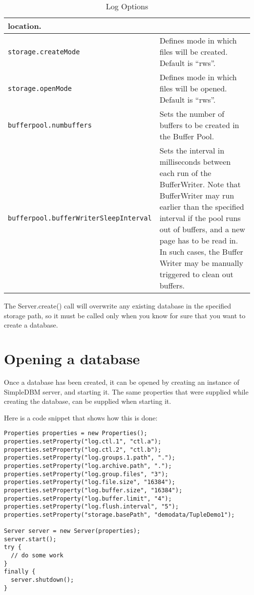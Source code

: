 \documentclass[a4paper,draft,oneside]{book}
\begin{document}
\begin{table}[h]
\begin{tabular}{|l|p{6cm}|}
  location.  \\
  \hline 
  \verb|storage.createMode|&Defines mode in which files will be
  created. Default is ``rws''.  \\
  \hline 
  \verb|storage.openMode|&Defines mode in which files will be
  opened. Default is ``rws''.  \\
  \hline 
  \verb|bufferpool.numbuffers|&Sets the number of buffers to be created in 
  the Buffer Pool.  \\
  \hline 
  \verb|bufferpool.bufferWriterSleepInterval|&Sets the interval in 
  milliseconds between each run of the BufferWriter. Note that BufferWriter 
  may run earlier than the specified interval if the pool runs out of 
  buffers, and a new page has to be read in. In such cases, the Buffer Writer
  may be manually triggered to clean out buffers.  \\
  \hline
\end{tabular}
\label{tab2} \caption{Log Options}
\end{table}

The Server.create() call will overwrite any existing database
in the specified storage path, so it must be called only when you know
for sure that you want to create a database.

\section{Opening a database}

Once a database has been created, it can be opened by creating an
instance of SimpleDBM server, and starting it. The same properties that were
supplied while creating the database, can be supplied when starting it.

Here is a code snippet that shows how this is done:

\begin{verbatim}
Properties properties = new Properties();
properties.setProperty("log.ctl.1", "ctl.a");
properties.setProperty("log.ctl.2", "ctl.b");
properties.setProperty("log.groups.1.path", ".");
properties.setProperty("log.archive.path", ".");
properties.setProperty("log.group.files", "3");
properties.setProperty("log.file.size", "16384");
properties.setProperty("log.buffer.size", "16384");
properties.setProperty("log.buffer.limit", "4");
properties.setProperty("log.flush.interval", "5");
properties.setProperty("storage.basePath", "demodata/TupleDemo1");

Server server = new Server(properties);
server.start();
try {
  // do some work
}
finally {
  server.shutdown();
}
\end{verbatim}
\end{document}
